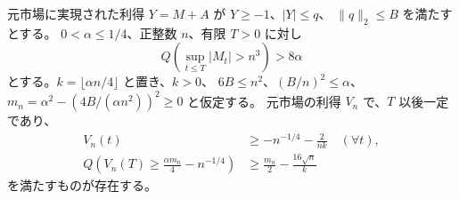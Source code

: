 \begin{lemma}[有限horizonの消失リスク戦略]\label{lem:quantitative-47}
元市場に実現された利得 $Y=M+A$ が $Y\geq-1$、$|Y|\leq q$、
$\|q\|_2\leq B$ を満たすとする。
$0<\alpha\leq1/4$、正整数 $n$、有限 $T>0$ に対し
\[
 Q\left(\sup_{t\leq T}|M_t|>n^3\right)>8\alpha
\]
とする。$k=\lfloor\alpha n/4\rfloor$ と置き、$k>0$、
$6B\leq n^2$、$(B/n)^2\leq\alpha$、
$m_n=\alpha^2-(4B/(\alpha n^2))^2\geq0$ と仮定する。
元市場の利得 $V_n$ で、$T$ 以後一定であり、
\[
 \begin{aligned}
 V_n(t)&\geq-n^{-1/4}-\frac{2}{nk}\quad(\forall t),\\
 Q\left(V_n(T)\geq\frac{\alpha m_n}{4}-n^{-1/4}\right)
 &\geq\frac{m_n}{2}-\frac{16\sqrt n}{k}
 \end{aligned}
\]
を満たすものが存在する。
\end{lemma}
